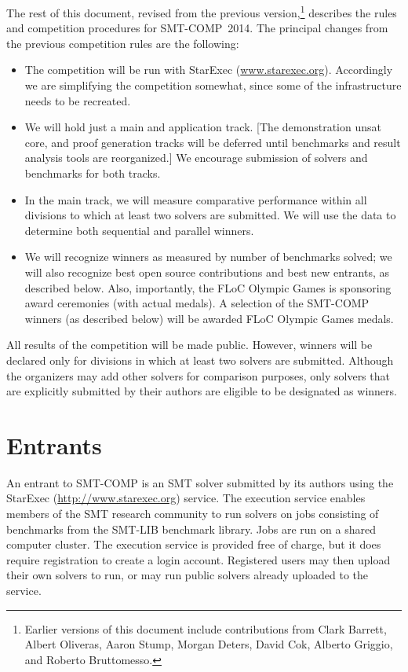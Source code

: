 \documentclass[12pt]{article}
\begin{document}
The rest of this document, revised from the previous 
version,\footnote{Earlier versions of this document include contributions from
Clark Barrett, Albert Oliveras, Aaron Stump, Morgan Deters, David Cok, Alberto Griggio, and Roberto Bruttomesso.}
describes the rules and competition procedures for SMT-COMP~2014.
The principal changes from the previous competition rules are the following:
\begin{itemize}
\item The competition will be run with StarExec (\url{www.starexec.org}). Accordingly we are simplifying the competition somewhat, since some of the infrastructure needs to be recreated.
\item We will hold just a main and application track. [The demonstration unsat core, and proof generation tracks will be deferred until benchmarks and result analysis tools are reorganized.] We encourage submission of solvers and benchmarks for both tracks.
\item In the main track, we will measure comparative performance within all divisions to which at least two solvers are submitted. We will use the data to determine both sequential and parallel winners.

\item We will recognize winners as measured by number of benchmarks solved; we will also recognize best open source contributions and best new entrants, as described below. 
Also, importantly, the FLoC Olympic Games is sponsoring award ceremonies (with actual medals). A selection of the SMT-COMP winners (as described below) will be awarded FLoC Olympic Games medals.

\end{itemize}

All results of the competition will be made public. However, 
winners will be declared only for divisions in which at least two solvers are submitted.
Although the organizers may add other solvers for comparison purposes, only solvers that
are explicitly submitted by their authors are eligible to be designated as winners.

\section{Entrants}
\label{sec:entrants}

An entrant to SMT-COMP is an SMT solver
submitted by its authors using the StarExec (\url{http://www.starexec.org}) service.  
The execution service enables members of the
SMT research community to run solvers on jobs consisting of benchmarks
from the SMT-LIB benchmark library.  Jobs are run on a shared computer
cluster.  The execution service is provided free of
charge, but it does require registration to create a login account.  Registered users
may then upload their own solvers to run, or may run public solvers
already uploaded to the service.  
\end{document}
